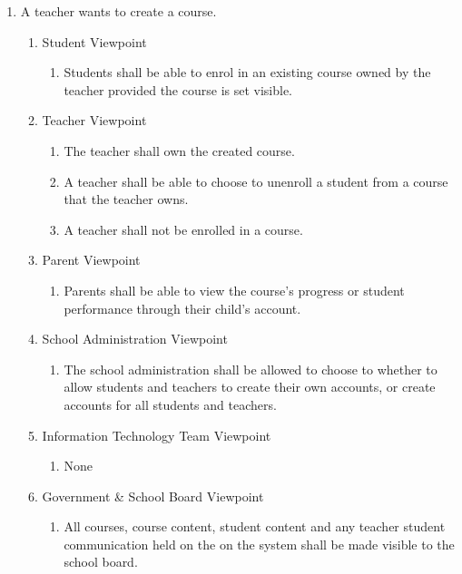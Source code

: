 \documentclass[]{article}
\begin{document}
\begin{enumerate}[{BE}1.]
	\item A teacher wants to create a course.
	\begin{enumerate}[{VP1}.1]
		\item Student Viewpoint
			\begin{enumerate}
				\item Students shall be able to enrol in an existing course owned by the
teacher provided the course is set visible.
			\end{enumerate}
		\item Teacher Viewpoint
			\begin{enumerate}
			    \item The teacher shall own the created course.
				\item A teacher shall be able to choose to unenroll a student from a course
that the teacher owns.
				\item A teacher shall not be enrolled in a course.
			\end{enumerate}
		\item Parent Viewpoint
			\begin{enumerate}
				\item Parents shall be able to view the course's progress or student
performance through their child's account.
			\end{enumerate}
		\item School Administration Viewpoint
			\begin{enumerate}
				\item The school administration shall be allowed to choose to whether to
allow students and teachers
to create their own accounts, or create accounts for all students and teachers.
			\end{enumerate}
		\item Information Technology Team Viewpoint
			\begin{enumerate}
				\item None
			\end{enumerate}
		\item Government \& School Board Viewpoint
			\begin{enumerate}
				\item All courses, course content, student content and any teacher student
communication held on the on the system shall be made visible to the school
board.
			\end{enumerate}
	\end{enumerate}


\end{enumerate}
\end{document}
